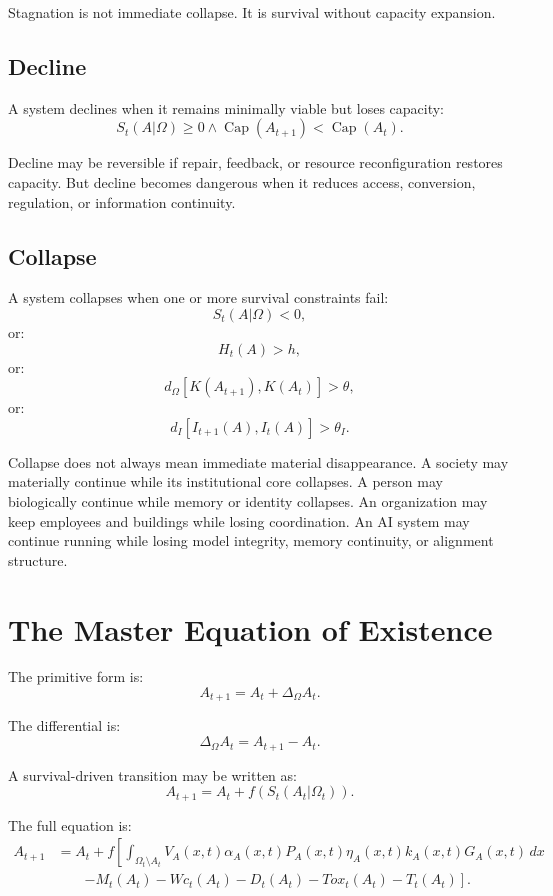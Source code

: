 \documentclass[11pt,a4paper]{article}
\newcommand{\Capacity}{\operatorname{Cap}}
\begin{document}
Stagnation is not immediate collapse. It is survival without capacity expansion.

\subsection{Decline}

A system declines when it remains minimally viable but loses capacity:
\[
S_t(A|\Omega)\geq0
\wedge
\Capacity(A_{t+1})<\Capacity(A_t).
\]

Decline may be reversible if repair, feedback, or resource reconfiguration restores capacity. But decline becomes dangerous when it reduces access, conversion, regulation, or information continuity.

\subsection{Collapse}

A system collapses when one or more survival constraints fail:
\[
S_t(A|\Omega)<0,
\]
or:
\[
H_t(A)>h,
\]
or:
\[
d_{\Omega}[K(A_{t+1}),K(A_t)]>\theta,
\]
or:
\[
d_I[I_{t+1}(A),I_t(A)]>\theta_I.
\]

Collapse does not always mean immediate material disappearance. A society may materially continue while its institutional core collapses. A person may biologically continue while memory or identity collapses. An organization may keep employees and buildings while losing coordination. An AI system may continue running while losing model integrity, memory continuity, or alignment structure.

\section{The Master Equation of Existence}

The primitive form is:
\[
A_{t+1}=A_t+\Delta_{\Omega}A_t.
\]

The differential is:
\[
\Delta_{\Omega}A_t=A_{t+1}-A_t.
\]

A survival-driven transition may be written as:
\[
A_{t+1}=A_t+f(S_t(A_t|\Omega_t)).
\]

The full equation is:
\[
\begin{aligned}
A_{t+1}
&= A_t + f\!\left[\int_{\Omega_t\setminus A_t}
V_A(x,t)\alpha_A(x,t)P_A(x,t)\eta_A(x,t)k_A(x,t)G_A(x,t)\,dx\right.\\
&\qquad\left. - M_t(A_t) - Wc_t(A_t) - D_t(A_t) - Tox_t(A_t) - T_t(A_t)\right].
\end{aligned}
\]
\end{document}
